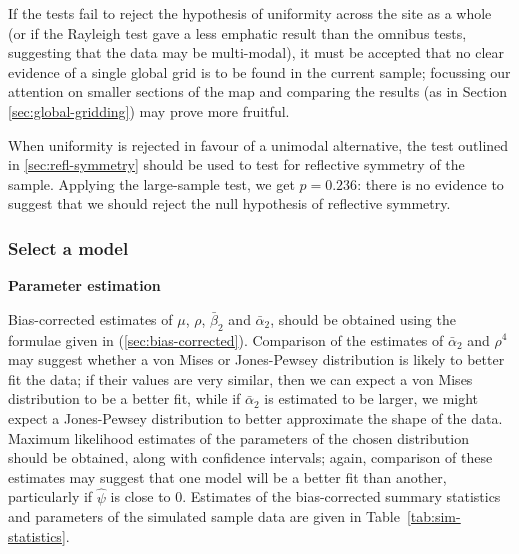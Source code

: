 \documentclass[../../ArchStats.tex]{subfiles}
\begin{document}
If the tests fail to reject the hypothesis of uniformity across the site as a whole (or if the Rayleigh test gave a less emphatic result than the omnibus tests, suggesting that the data may be multi-modal), it must be accepted that no clear evidence of a single global grid is to be found in the current sample; focussing our attention on smaller sections of the map and comparing the results (as in Section \ref{sec:global-gridding}) may prove more fruitful. 

When uniformity is rejected in favour of a unimodal alternative, the test outlined in \ref{sec:refl-symmetry} should be used to test for reflective symmetry of the sample. 
Applying the large-sample test, we get $p = 0.236$: there is no evidence to suggest that we should reject the null hypothesis of reflective symmetry.

\subsubsection{Select a model}
\label{sssec:model-selection}

\textbf{Parameter estimation}

Bias-corrected estimates of $\mu$, $\rho$, $\bar{\beta}_2$ and $\bar{\alpha}_2$, should be obtained using the formulae given in (\ref{sec:bias-corrected}). Comparison of the estimates of $\bar{\alpha}_2$ and $\rho^4$ may suggest whether a von Mises or Jones-Pewsey distribution is likely to better fit the data; if their values are very similar, then we can expect a von Mises distribution to be a better fit, while if $\bar{\alpha}_2$ is estimated to be larger, we might expect a Jones-Pewsey distribution to better approximate the shape of the data. Maximum likelihood estimates of the parameters of the chosen distribution should be obtained, along with confidence intervals; again, comparison of these estimates may suggest that one model will be a better fit than another, particularly if $\hat{\psi}$ is close to 0. Estimates of the bias-corrected summary statistics and parameters of the simulated sample data are given in Table~\ref{tab:sim-statistics}.
\end{document}
